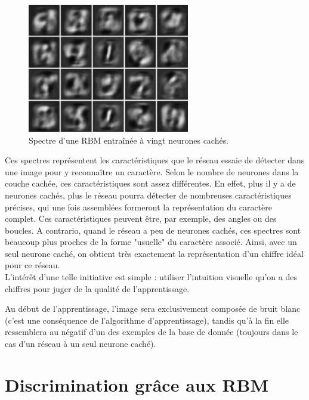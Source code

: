 \documentclass[a4paper,twoside]{report}
\begin{document}
                \begin{figure}
                    \begin{center}
                        \includegraphics[width=200pt]{Images/filters-01.png}
                    \end{center}
                    \caption{Spectre d'une RBM entraînée à vingt neurones cachés.}
                \end{figure}

                Ces spectres représentent les caractéristiques que le réseau essaie de détecter dans une image pour y reconnaître un caractère. Selon le nombre de neurones dans la couche cachée, ces caractéristiques sont assez différentes. En effet, plus il y a de neurones cachés, plus le réseau pourra détecter de nombreuses caractéristiques précises, qui une fois assemblées formeront la représentation du caractère complet. Ces caractéristiques peuvent être, par exemple, des angles ou des boucles. A contrario, quand le réseau a peu de neurones cachés, ces spectres sont beaucoup plus proches de la forme "usuelle" du caractère associé. Ainsi, avec un seul neurone caché, on obtient très exactement la représentation d'un chiffre idéal pour ce réseau.\\

                L'intérêt d'une telle initiative est simple : utiliser l'intuition visuelle qu'on a des chiffres pour juger de la qualité de l'apprentissage.

                Au début de l'apprentissage, l'image sera exclusivement composée de bruit blanc (c'est une conséquence de l'algorithme d'apprentissage), tandis qu'à la fin elle ressemblera au négatif d'un des exemples de la base de donnée (toujours dans le cas d'un réseau à un seul neurone caché).

\section{Discrimination grâce aux RBM}
\end{document}
